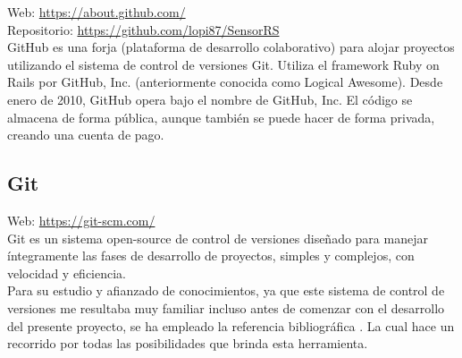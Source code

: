 
Web: \url{https://about.github.com/} \cite{website:2} \\
Repositorio: \url{https://github.com/lopi87/SensorRS}\\


GitHub es una forja (plataforma de desarrollo colaborativo) para alojar proyectos utilizando el sistema de control de versiones Git. Utiliza el framework Ruby on Rails por GitHub, Inc. (anteriormente conocida como Logical Awesome). Desde enero de 2010, GitHub opera bajo el nombre de GitHub, Inc. El código se almacena de forma pública, 
aunque también se puede hacer de forma privada, creando una cuenta de pago.\\

\subsection{Git}


Web: \url{https://git-scm.com/}\\

Git es un sistema open-source de control de versiones diseñado para manejar íntegramente las fases de desarrollo de proyectos, simples y complejos, con velocidad y eficiencia.\\

Para su estudio y afianzado de conocimientos, ya que este sistema de control de versiones me resultaba muy familiar incluso antes de comenzar con el desarrollo del presente proyecto, se ha empleado 
la referencia bibliográfica \cite{book:git}. La cual hace un recorrido por todas las posibilidades que brinda esta herramienta.\\


